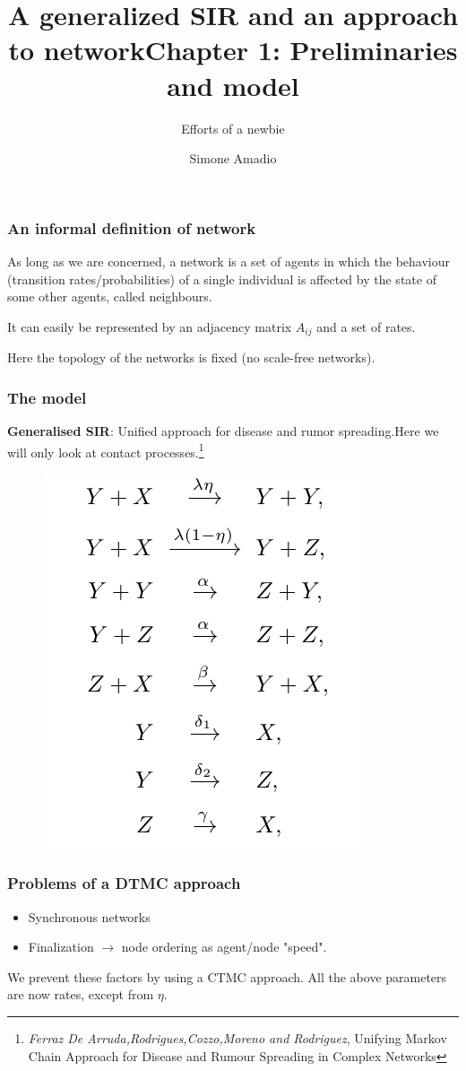 \documentclass{beamer}
\title{A generalized SIR and an approach to network}
\subtitle{Efforts of a newbie}
\date{Simone Amadio}
\begin{document}
	\begin{frame}
		\titlepage
	\end{frame}



	\begin{frame}
	\title{Chapter 1: Preliminaries and model}
	\subtitle{}
	\date{}
	\titlepage
	\end{frame}


	\begin{frame}
		\frametitle{An informal definition of network}
		As long as we are concerned, a network is a set of agents in which the behaviour (transition rates/probabilities) of a single individual is affected by the state of some other agents, called neighbours.
		
		It can easily be represented by an adjacency matrix $A_{ij}$ and a set of rates. 
		
		Here the topology of the networks is fixed (no scale-free networks).
	\end{frame}



	\begin{frame}
		
		\frametitle{The model}
		
		\textbf{Generalised SIR}: Unified approach for disease and rumor spreading.Here we will only look at contact processes.\footnote{\textit{Ferraz De Arruda,Rodrigues,Cozzo,Moreno and Rodriguez}, Unifying Markov Chain Approach for Disease and Rumour Spreading in Complex Networks}
		
		\begin{figure}
			\centering
			\includegraphics[width=0.4\linewidth]{transitions}
			\label{fig:transitions}
		\end{figure}
		
		
	\end{frame}

	\begin{frame}
	\frametitle{Problems of a DTMC approach}
	
	\begin{itemize}
		\item Synchronous networks
		\item Finalization $\rightarrow$ node ordering as agent/node "speed".  
	\end{itemize}

	We prevent these factors by using a CTMC approach. All the above parameters are now rates, except from $\eta$.

	\end{frame}
\end{document}
